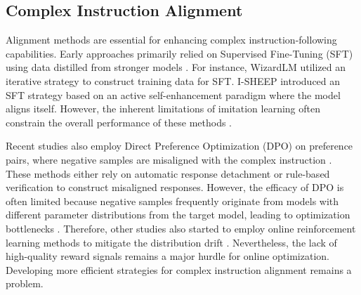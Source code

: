 \subsection{Complex Instruction Alignment}

Alignment methods are essential for enhancing complex instruction-following capabilities. Early approaches primarily relied on Supervised Fine-Tuning (SFT) using data distilled from stronger models \citep{xu2023wizardlm, sun2024conifer}. For instance, WizardLM \citep{xu2023wizardlm} utilized an iterative strategy to construct training data for SFT. I-SHEEP \citep{isheep} introduced an SFT strategy based on an active self-enhancement paradigm where the model aligns itself. However, the inherent limitations of imitation learning often constrain the overall performance of these methods \citep{gudibande2023falsepromiseimitatingproprietary}.

Recent studies also employ Direct Preference Optimization (DPO) on preference pairs, where negative samples are misaligned with the complex instruction \citep{huang2025musc, he2024complex, pham2024suri}. These methods either rely on automatic response detachment \citep{huang2025musc,ren2025step} or rule-based verification \citep{guo2025recast} to construct misaligned responses. However, the efficacy of DPO is often limited because negative samples frequently originate from models with different parameter distributions from the target model, leading to optimization bottlenecks \citep{ivison2024unpacking}. Therefore, other studies also started to employ online reinforcement learning methods to mitigate the distribution drift \citep{ren2026lsriflogicstructuredreinforcementlearning,qin2025incentivizingreasoningadvancedinstructionfollowing}. Nevertheless, the lack of high-quality reward signals remains a major hurdle for online optimization. Developing more efficient strategies for complex instruction alignment remains a problem.